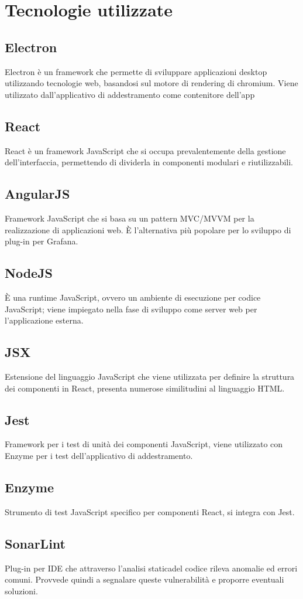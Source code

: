 \section{Tecnologie utilizzate}
	\subsection{Electron}
		Electron è un framework che permette di sviluppare applicazioni desktop utilizzando tecnologie web, basandosi sul motore di rendering di chromium. Viene utilizzato dall'applicativo di addestramento come contenitore dell'app
	\subsection{React}
		React è un framework JavaScript che si occupa prevalentemente della gestione dell'interfaccia, permettendo di dividerla in componenti modulari e riutilizzabili.
	\subsection{AngularJS}
		Framework JavaScript che si basa su un pattern MVC/MVVM per la realizzazione di applicazioni web. È l'alternativa più popolare per lo sviluppo di plug-in per Grafana\glo.
	\subsection{NodeJS}
		È una runtime JavaScript, ovvero un ambiente di esecuzione per codice JavaScript; viene impiegato nella fase di sviluppo come server web per l'applicazione esterna.
	\subsection{JSX}
		Estensione del linguaggio JavaScript che viene utilizzata per definire la struttura dei componenti in React, presenta numerose similitudini al linguaggio HTML.
	\subsection{Jest}
		Framework per i test di unità dei componenti JavaScript, viene utilizzato con Enzyme per i test dell'applicativo di addestramento.
	\subsection{Enzyme}
		Strumento di test JavaScript specifico per componenti React, si integra con Jest.
	\subsection{SonarLint}
		Plug-in per IDE che attraverso l'analisi statica\glosp del codice rileva anomalie ed errori comuni. Provvede quindi a segnalare queste vulnerabilità e proporre eventuali soluzioni.

